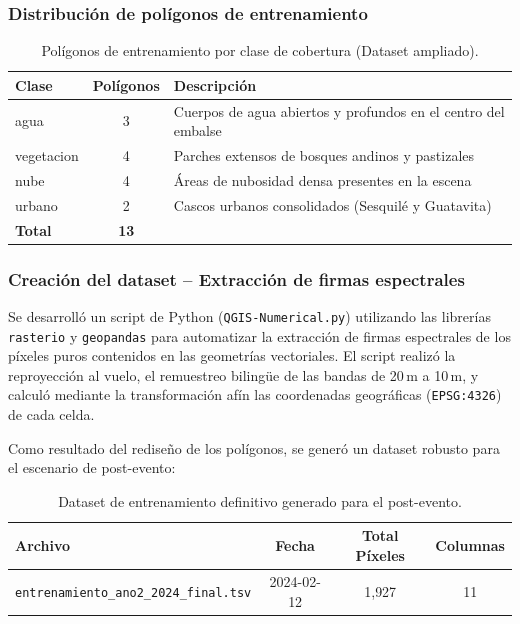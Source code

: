 \documentclass[12pt, letterpaper]{article}
\begin{document}
\subsubsection*{Distribuci\'on de pol\'igonos de entrenamiento}

\begin{table}[H]
  \centering
  \caption{Pol\'igonos de entrenamiento por clase de cobertura (Dataset ampliado).}
  \label{tab:poligonos}
  \begin{tabular}{lcp{7cm}}
    \toprule
    \textbf{Clase} & \textbf{Pol\'igonos} & \textbf{Descripci\'on} \\
    \midrule
    agua       & 3& Cuerpos de agua abiertos y profundos en el centro del embalse \\
    vegetacion & 4& Parches extensos de bosques andinos y pastizales \\
    nube       & 4& \'Areas de nubosidad densa presentes en la escena \\
    urbano     & 2& Cascos urbanos consolidados (Sesquil\'e y Guatavita) \\
    \midrule
    \textbf{Total} & \textbf{13}& \\
    \bottomrule
  \end{tabular}
\end{table}
\subsubsection*{Creaci\'on del dataset -- Extracci\'on de firmas espectrales}

Se desarroll\'o un script de Python (\texttt{QGIS-Numerical.py}) utilizando las librer\'ias \texttt{rasterio} y \texttt{geopandas} para automatizar la extracci\'on de firmas espectrales de los p\'ixeles puros contenidos en las geometr\'ias vectoriales. El script realiz\'o la reproyecci\'on al vuelo, el remuestreo biling\"ue de las bandas de 20\,m a 10\,m, y calcul\'o mediante la transformaci\'on af\'in las coordenadas geogr\'aficas (\texttt{EPSG:4326}) de cada celda.

Como resultado del redise\~no de los pol\'igonos, se gener\'o un dataset robusto para el escenario de post-evento:

\begin{table}[H]
  \centering
  \caption{Dataset de entrenamiento definitivo generado para el post-evento.}
  \label{tab:datasets}
  \begin{tabular}{lccc}
    \toprule
    \textbf{Archivo} & \textbf{Fecha} & \textbf{Total P\'ixeles} & \textbf{Columnas} \\
    \midrule
    \texttt{entrenamiento\_ano2\_2024\_final.tsv} & 2024-02-12 & 1{,}927 & 11 \\
    \bottomrule
  \end{tabular}
\\
\end{table}
\end{document}
